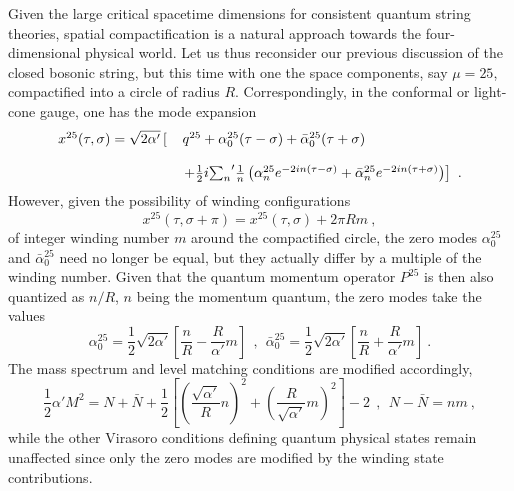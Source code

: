 \documentclass[a4paper,11pt]{article}
\begin{document}
Given the large critical spacetime dimensions for consistent quantum
string theories, spatial compactification is a natural approach towards
the four-dimensional physical world. Let us thus reconsider our previous
discussion of the closed bosonic string, but this time with one the
space components, say $\mu=25$, compactified into a circle of radius 
$R$.\cite{Pol,GSW} Correspondingly, in the conformal or light-cone gauge, 
one has the mode expansion
\begin{equation}
\begin{array}{r l}
x^{25}(\tau,\sigma)=\sqrt{2\alpha'}\left[\right.&q^{25}+
\alpha^{25}_0(\tau-\sigma)+\bar{\alpha}^{25}_0(\tau+\sigma)\\
 & \\
&\left. +\frac{1}{2}i{\sum_n}'\frac{1}{n}\left(\alpha^{25}_n
e^{-2in(\tau-\sigma)}+\bar{\alpha}^{25}_ne^{-2in(\tau+\sigma)}\right)\right]\ .
\end{array}
\end{equation}
However, given the possibility of winding configurations 
\begin{equation}
x^{25}(\tau,\sigma+\pi)=x^{25}(\tau,\sigma)+2\pi R m\ ,
\end{equation}
of integer winding number $m$ around the compactified circle, the zero modes
$\alpha^{25}_0$ and $\bar{\alpha}^{25}_0$ need no longer be equal, but they
actually differ by a multiple of the winding number. Given that the
quantum momentum operator $P^{25}$ is then also quantized as $n/R$, $n$
being the momentum quantum, the zero modes take the values
\begin{equation}
\alpha^{25}_0=\frac{1}{2}\sqrt{2\alpha'}
\left[\frac{n}{R}-\frac{R}{\alpha'}m\right]\ \ ,\ \ 
\bar{\alpha}^{25}_0=\frac{1}{2}\sqrt{2\alpha'}
\left[\frac{n}{R}+\frac{R}{\alpha'}m\right]\ .
\end{equation}
The mass spectrum and level matching conditions are modified accordingly,
\begin{equation}
\frac{1}{2}\alpha' M^2=N+\bar{N}+\frac{1}{2}
\left[\left(\frac{\sqrt{\alpha'}}{R}n\right)^2+
\left(\frac{R}{\sqrt{\alpha'}}m\right)^2\right]-2\ \ ,\ \ 
N-\bar{N}=nm\ ,
\end{equation}
while the other Virasoro conditions defining quantum physical states remain
unaffected since only the zero modes are modified by the winding state
contributions.
\end{document}
